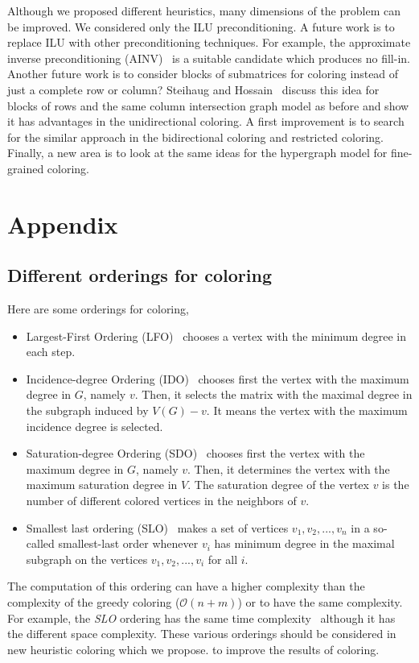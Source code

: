 \documentclass[12pt, twoside,a4paper,toc=bibliography]{scrbook}
\begin{document}
Although we proposed different heuristics, many dimensions of the problem can be improved. 
We considered only the ILU preconditioning. A future work is to replace ILU
with other preconditioning techniques.
For example, the approximate inverse preconditioning (AINV)~\cite{ainv98} is a 
suitable candidate which produces no fill-in.
Another future work is to consider blocks of submatrices for coloring instead of just a complete row or column? Steihaug and Hossain~\cite{Steihaug1997GCa} discuss this idea for blocks of rows and the same column intersection graph model as before and show it has advantages in the unidirectional coloring. A first improvement is to search for the similar approach in the bidirectional coloring and restricted coloring. Finally, a new area is to look at the same ideas for the hypergraph model for fine-grained coloring.



\chapter*{Appendix}
\label{appendix}
\setcounter{chapter}{1}
\renewcommand\thechapter{\Alph{chapter}}
\section{Different orderings for coloring}
\label{app.ord}
Here are some orderings for coloring,
\begin{itemize}
\item Largest-First Ordering (LFO)~\cite{LFO} chooses a vertex with the minimum degree in each step.
\item Incidence-degree Ordering (IDO)~\cite{IDO} chooses first the vertex with the maximum degree in $G$, namely $v$. Then, it selects the matrix with the maximal degree in the subgraph induced by $V(G)-v$. It means the vertex with the maximum incidence degree is selected.
\item Saturation-degree Ordering (SDO)~\cite{SDO} chooses first the vertex with the maximum degree in $G$, namely $v$. Then, it determines the vertex with the maximum saturation degree in
$V$. The saturation degree of the vertex $v$ is the number of different colored vertices in the neighbors of $v$.
\item Smallest last ordering (SLO)~\cite{ordering1} makes a set of vertices ${v_1,v_2,...,v_n}$ in a so-called smallest-last
order whenever $v_i$ has minimum degree in the maximal subgraph on the vertices $v_1,v_2,...,v_i$ for all $i$.
\end{itemize}
The computation of this ordering can have a higher complexity than the complexity of the greedy coloring ($\mathcal{O}(n+m)$) or to have the same complexity. For example, the \textit{SLO} ordering has the same time complexity~\cite{ordering1} although it has the different space complexity. These various orderings should be considered in new heuristic coloring which we propose. to improve the results of coloring.
\clearpage
\end{document}

